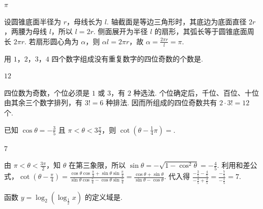 \documentclass[UTF8,a4paper,oneside,11pt]{ctexbook}
\begin{document}
\begin{answer}
\(\pi\)
\end{answer}

\begin{solution}
设圆锥底面半径为 \(r\)，母线长为 \(l\). 轴截面是等边三角形时，其底边为底面直径 \(2r\)，两腰为母线 \(l\)，所以 \(l=2r\). 侧面展开为半径 \(l\) 的扇形，其弧长等于圆锥底面周长 \(2\pi r\). 若扇形圆心角为 \(\alpha\)，则 \(\alpha l=2\pi r\)，故 \(\alpha=\frac{2\pi r}{l}=\pi\).
\end{solution}

\begin{problem}

用 \(1\)，\(2\)，\(3\)，\(4\) 四个数字组成没有重复数字的四位奇数的个数是\fillinblank{}.
\end{problem}

\begin{answer}
\(12\)
\end{answer}

\begin{solution}
四位数为奇数，个位必须是 \(1\) 或 \(3\)，有 \(2\) 种选法. 个位确定后，千位、百位、十位由其余三个数字排列，有 \(3!=6\) 种排法. 因而所组成的四位奇数共有 \(2\cdot3!=12\) 个.
\end{solution}

\begin{problem}

已知 \(\cos \theta = -\frac{3}{5}\) 且 \(\pi < \theta < 3\frac{\pi}{2}\)，则 \(\cot\left( \theta - \frac{1}{4}\pi \right) =\)\fillinblank{}.
\end{problem}

\begin{answer}
\(7\)
\end{answer}

\begin{solution}
由 \(\pi<\theta<\frac{3\pi}{2}\)，知 \(\theta\) 在第三象限，所以 \(\sin\theta=-\sqrt{1-\cos^2\theta}=-\frac45\). 利用和差公式，\(\cot\left(\theta-\frac{\pi}{4}\right)=\frac{\cos\theta\cos\frac{\pi}{4}+\sin\theta\sin\frac{\pi}{4}}{\sin\theta\cos\frac{\pi}{4}-\cos\theta\sin\frac{\pi}{4}}=\frac{\cos\theta+\sin\theta}{\sin\theta-\cos\theta}\). 代入得 \(\frac{-\frac35-\frac45}{-\frac45+\frac35}=\frac{-\frac75}{-\frac15}=7\).
\end{solution}

\begin{problem}

函数 \(y = \log_2\left(\log_{\frac{1}{2}}x\right) \) 的定义域是\fillinblank{}.
\end{problem}
\end{document}
